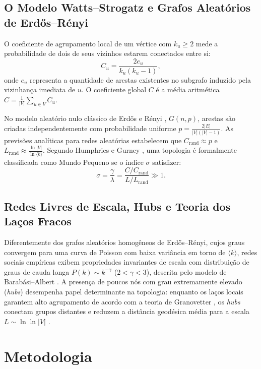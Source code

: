 \documentclass[conference]{IEEEtran}
\begin{document}
\subsection{O Modelo Watts--Strogatz e Grafos Aleatórios de Erdős--Rényi}
O coeficiente de agrupamento local de um vértice com $k_u \ge 2$ mede a probabilidade de dois de seus vizinhos estarem conectados entre si:
\begin{equation}
C_u = \frac{2 e_u}{k_u (k_u - 1)},
\end{equation}
onde $e_u$ representa a quantidade de arestas existentes no subgrafo induzido pela vizinhança imediata de $u$. O coeficiente global $C$ é a média aritmética $C = \frac{1}{|V|} \sum_{u \in V} C_u$.

No modelo aleatório nulo clássico de Erdős e Rényi \cite{erdos1959random}, $G(n, p)$, arestas são criadas independentemente com probabilidade uniforme $p = \frac{2|E|}{|V|(|V|-1)}$. As previsões analíticas para redes aleatórias estabelecem que $C_{\text{rand}} \approx p$ e $L_{\text{rand}} \approx \frac{\ln |V|}{\ln \langle k \rangle}$. Segundo Humphries e Gurney \cite{humphries2008network}, uma topologia é formalmente classificada como Mundo Pequeno se o índice $\sigma$ satisfizer:
\begin{equation}
\sigma = \frac{\gamma}{\lambda} = \frac{C / C_{\text{rand}}}{L / L_{\text{rand}}} \gg 1.
\end{equation}

\subsection{Redes Livres de Escala, Hubs e Teoria dos Laços Fracos}
Diferentemente dos grafos aleatórios homogêneos de Erdős--Rényi, cujos graus convergem para uma curva de Poisson com baixa variância em torno de $\langle k \rangle$, redes sociais empíricas exibem propriedades invariantes de escala com distribuição de graus de cauda longa $P(k) \sim k^{-\gamma}$ ($2 < \gamma < 3$), descrita pelo modelo de Barabási--Albert \cite{barabasi1999emergence}. A presença de poucos nós com grau extremamente elevado (\textit{hubs}) desempenha papel determinante na topologia: enquanto os laços locais garantem alto agrupamento de acordo com a teoria de Granovetter \cite{granovetter1973strength}, os \textit{hubs} conectam grupos distantes e reduzem a distância geodésica média para a escala $L \sim \ln \ln |V|$ \cite{newman2003structure,latora2001efficient}.

\section{Metodologia}
\label{sec:metodologia}
\end{document}
